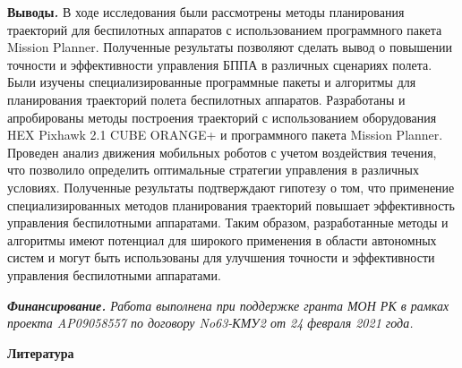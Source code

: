 \begin{multicols}{2}
{\bfseries Выводы\emph{.}} В ходе исследования были рассмотрены методы
планирования траекторий для беспилотных аппаратов с использованием
программного пакета Mission Planner. Полученные результаты позволяют
сделать вывод о повышении точности и эффективности управления БППА в
различных сценариях полета. Были изучены специализированные программные
пакеты и алгоритмы для планирования траекторий полета беспилотных
аппаратов. Разработаны и апробированы методы построения траекторий с
использованием оборудования HEX Pixhawk 2.1 CUBE ORANGE+ и программного
пакета Mission Planner. Проведен анализ движения мобильных роботов с
учетом воздействия течения, что позволило определить оптимальные
стратегии управления в различных условиях. Полученные результаты
подтверждают гипотезу о том, что применение специализированных методов
планирования траекторий повышает эффективность управления беспилотными
аппаратами. Таким образом, разработанные методы и алгоритмы имеют
потенциал для широкого применения в области автономных систем и могут
быть использованы для улучшения точности и эффективности управления
беспилотными аппаратами.

\emph{{\bfseries Финансирование.} Работа выполнена при поддержке гранта МОН
РК в рамках проекта AP09058557 по договору No63-КМУ2 от 24 февраля 2021
года.}
\end{multicols}

\begin{center}
  {\bfseries Литература}
  \end{center}

